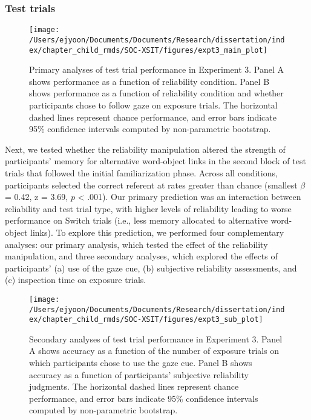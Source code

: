 \documentclass[oneside]{report}
\begin{document}
\subsubsection{Test trials}\label{test-trials-2}
\begin{figure}[!t]

{\centering \texttt{[image: /Users/ejyoon/Documents/Documents/Research/dissertation/index/chapter\_child\_rmds/SOC-XSIT/figures/expt3\_main\_plot]} 

}

\caption[Primary analyses of test trial performance in Experiment 4.3]{Primary analyses of test trial performance in Experiment 3. Panel A shows performance as a function of reliability condition. Panel B shows performance as a function of reliability condition and whether participants chose to follow gaze on exposure trials. The horizontal dashed lines represent chance performance, and error bars indicate 95\% confidence intervals computed by non-parametric bootstrap.}\label{fig:e3-plot}
\end{figure}
Next, we tested whether the reliability manipulation altered the
strength of participants' memory for alternative word-object links in
the second block of test trials that followed the initial
familiarization phase. Across all conditions, participants selected the
correct referent at rates greater than chance (smallest \(\beta\) =
0.42, z = 3.69, \(p\) \textless{} .001). Our primary prediction was an
interaction between reliability and test trial type, with higher levels
of reliability leading to worse performance on Switch trials (i.e., less
memory allocated to alternative word-object links). To explore this
prediction, we performed four complementary analyses: our primary
analysis, which tested the effect of the reliability manipulation, and
three secondary analyses, which explored the effects of participants'
(a) use of the gaze cue, (b) subjective reliability assessments, and (c)
inspection time on exposure trials.
\begin{figure}[!t]

{\centering \texttt{[image: /Users/ejyoon/Documents/Documents/Research/dissertation/index/chapter\_child\_rmds/SOC-XSIT/figures/expt3\_sub\_plot]} 

}

\caption[Secondary analyses of test trial performance in Experiment 4.3]{Secondary analyses of test trial performance in Experiment 3. Panel A shows accuracy as a function of the number of exposure trials on which participants chose to use the gaze cue. Panel B shows accuracy as a function of participants' subjective reliability judgments. The horizontal dashed lines represent chance performance, and error bars indicate 95\% confidence intervals computed by non-parametric bootstrap.}\label{fig:expt3-sub-plots}
\end{figure}
\end{document}
